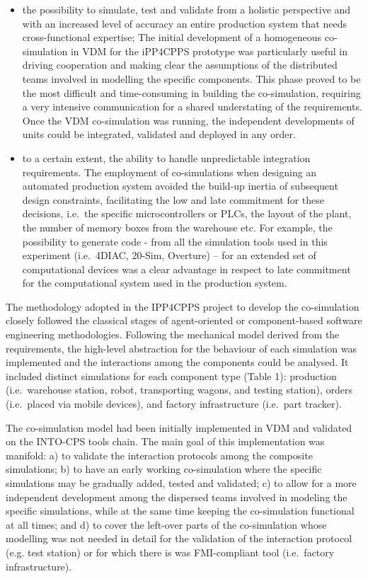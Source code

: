 \begin{itemize}
\item the possibility to simulate, test and validate from a holistic perspective and with an increased level of accuracy an entire production system that needs cross-functional expertise; The initial development of a homogeneous co-simulation in VDM for the iPP4CPPS prototype was particularly useful in driving cooperation and making clear the assumptions of the distributed teams involved in modelling the specific components. This phase proved to be the most difficult and time-consuming in building the co-simulation, requiring a very intensive communication for a shared understating of the requirements. Once the VDM co-simulation was running, the independent developments of units could be integrated, validated and deployed in any order.
\item to a certain extent, the ability to handle unpredictable integration requirements. The employment of co-simulations when designing an automated production system avoided the build-up inertia of subsequent design constraints, facilitating the low and late commitment for these decisions, i.e.\ the specific microcontrollers or PLCs, the layout of the plant, the number of memory boxes from the warehouse etc. For example, the possibility to generate code - from all the simulation tools used in this experiment (i.e.\ 4DIAC, 20-Sim, Overture) -- for an extended set of computational devices was a clear advantage in respect to late commitment for the computational system used in the production system. 
\end{itemize}

The methodology adopted in the IPP4CPPS project to develop the co-simulation closely followed the classical stages of agent-oriented or component-based software engineering methodologies. Following the mechanical model derived from the requirements, the high-level abstraction for the behaviour of each simulation was implemented and the interactions among the components could be analysed. It included distinct simulations for each component type (Table 1): production (i.e.\ warehouse station, robot, transporting wagons, and testing station), orders (i.e.\ placed via mobile devices), and factory infrastructure (i.e.\ part tracker). 

The co-simulation model had been initially implemented in VDM and validated on the INTO-CPS tools chain. The main goal of this implementation was manifold: a) to validate the interaction protocols among the composite simulations; b) to have an early working co-simulation where the specific simulations may be gradually added, tested and validated; c) to allow for a more independent development among the dispersed teams involved in modeling the specific simulations, while at the same time keeping the co-simulation functional at all times; and d) to cover the left-over parts of the co-simulation whose modelling was not needed in detail for the validation of the interaction protocol (e.g. test station) or for which there is was FMI-compliant tool (i.e.\ factory infrastructure).   

